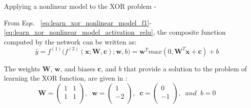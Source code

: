 \begin{frame}[t,allowframebreaks]{Applying a nonlinear model to the XOR problem -}
    \framebreak

    From Eqs.~
    \ref{eq:learn_xor_nonlinear_model_f1}-\ref{eq:learn_xor_nonlinear_model_activation_relu},
    the composite function computed by the network
    can be written as:
    \begin{equation}
        \hat{y} = 
        f^{(1)}\Big(f^{(2)}(\mathbf{x};\mathbf{W},\mathbf{c});\mathbf{w},b\Big) =
        \mathbf{w}^{T} max(0, \mathbf{W}^{T} \mathbf{x} + \mathbf{c}) + b 
        \label{eq:learn_xor_nonlinear_model_final}
    \end{equation}        

    The weights $\mathbf{W}$, $\mathbf{w}$, and biases $\mathbf{c}$, and $b$
    that provide a solution to the problem of learning the XOR function, are 
    given in \cite{Goodfellow:2017MITDL}:
    \begin{equation}    
        \mathbf{W} = 
        \begin{pmatrix}
            1 & 1 \\
            1 & 1 \\
        \end{pmatrix}, 
        \;\; 
        \mathbf{w} = 
        \begin{pmatrix}
            1  \\
            -2 \\
        \end{pmatrix}, 
        \;\;
        \mathbf{c} = 
        \begin{pmatrix}
            0 \\
            -1 \\
        \end{pmatrix},         
        \;\;         
        and \;\; b = 0
        \label{eq:learn_xor_nonlinear_model_weights}
    \end{equation}


\end{frame}
